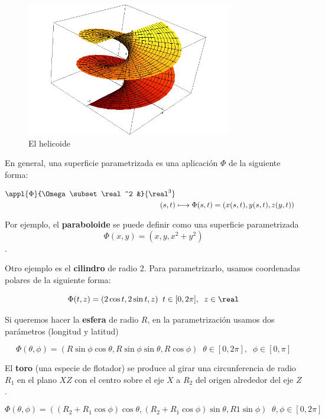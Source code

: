 \documentclass[nochap]{apuntes}
\begin{document}
\begin{figure}[hbtp]    
	\begin{center} 
		\includegraphics[width=0.8\textwidth]{img/Helicoide.png}  
		\caption{El helicoide} 
	\end{center}  
\end{figure}

En general, una superficie parametrizada es una aplicación $\Phi$ de la siguiente forma:

\begin{align*} \appl{\Phi}{\Omega \subset \real^2 &}{\real^3} \\
 (s,t) &\longmapsto \Phi(s,t) = (x(s,t), y(s,t), z(y,t)) \end{align*}

Por ejemplo, el \textbf{paraboloide} se puede definir como una superficie parametrizada \[\Phi(x,y) = (x,y,x^2+y^2)\].

Otro ejemplo es el \textbf{cilindro} de radio 2. Para parametrizarlo, usamos coordenadas polares de la siguiente forma:

\[ \Phi(t,z) = (2\cos t, 2\sin t, z)\;\;t\in [0, 2\pi],\;\; z\in \real \]

Si queremos hacer la \textbf{esfera} de radio $R$, en la parametrización usamos dos parámetros (longitud y latitud)

\[ \Phi(\theta, \phi) = (R\sin\phi\cos\theta, R\sin\phi\sin\theta, R\cos\phi)\;\; \theta\in[0,2\pi],\;\;\phi\in[0, \pi] \]

El \textbf{toro} (una especie de flotador) se produce al girar una circunferencia de radio $R_1$ en el plano $XZ$ con el centro sobre el eje $X$ a $R_2$ del origen alrededor del eje $Z$.

\[ \Phi(\theta, \phi) = ((R_2+R_1\cos\phi)\cos\theta,(R_2+R_1\cos\phi)\sin \theta,R1\sin \phi)\;\; \theta, \phi \in [0, 2\pi] \]
\end{document}
